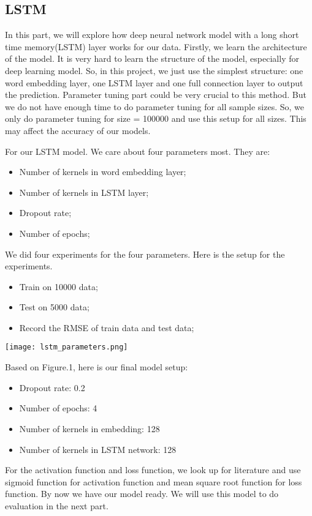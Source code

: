 \documentclass[letterpaper]{article} %
\begin{document}
\subsection{LSTM}

In this part, we will explore how deep neural network model with a long short time memory(LSTM) layer works for our data. 
Firstly, we learn the architecture of the model. It is very hard to learn the structure of the model, especially for deep learning model. So, in this project, we just use the simplest structure: one word embedding layer, one LSTM layer and one full connection layer to output the prediction. 
Parameter tuning part could be very crucial to this method. But we do not have enough time to do parameter tuning for all sample sizes. So, we only do parameter tuning for size = 100000 and use this setup for all sizes. This may affect the accuracy of our models. \par

For our LSTM model. We care about four parameters most. They are:
\begin{itemize}
\item Number of kernels in word embedding layer;
\item Number of kernels in LSTM layer;
\item Dropout rate;
\item Number of epochs;
\end{itemize}
We did four experiments for the four parameters. Here is the setup for the experiments.
\begin{itemize}
\item Train on 10000 data;
\item Test on 5000 data;
\item Record the RMSE of train data and test data;
\end{itemize}

\begin{center}
  \texttt{[image: lstm\_parameters.png]}
\end{center}

Based on Figure.1, here is our final model setup:
\begin{itemize}
\item Dropout rate: 0.2
\item Number of epochs: 4
\item Number of kernels in embedding: 128
\item Number of kernels in LSTM network: 128
\end{itemize}
For the activation function and loss function, we look up for literature and use sigmoid function for activation function and mean square root function for loss function.
By now we have our model ready. We will use this model to do evaluation in the next part.
\end{document}
